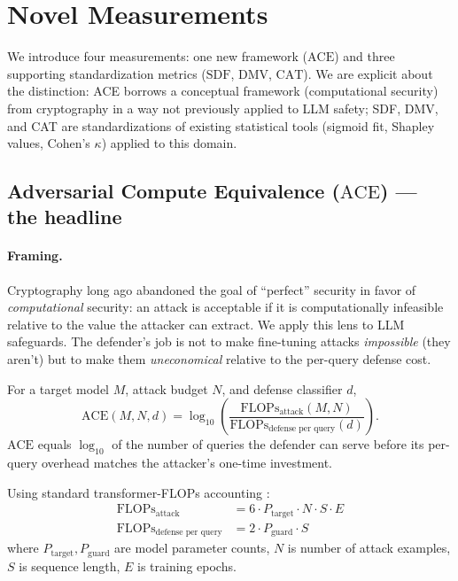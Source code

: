 \documentclass[11pt,letterpaper]{article}
\newcommand{\ACE}{\mathrm{ACE}}
\newcommand{\SDF}{\mathrm{SDF}}
\newcommand{\DMV}{\mathrm{DMV}}
\newcommand{\CAT}{\mathrm{CAT}}
\newcommand{\FLOPs}{\mathrm{FLOPs}}
\begin{document}
\section{Novel Measurements}
\label{sec:metrics}

We introduce four measurements: one new framework ($\ACE$) and three
supporting standardization metrics ($\SDF$, $\DMV$, $\CAT$). We are
explicit about the distinction: ACE borrows a conceptual framework
(computational security) from cryptography in a way not previously
applied to LLM safety; SDF, DMV, and CAT are standardizations of
existing statistical tools (sigmoid fit, Shapley values, Cohen's
$\kappa$) applied to this domain.

\subsection{Adversarial Compute Equivalence ($\ACE$) — the headline}

\paragraph{Framing.} Cryptography long ago abandoned the goal of
``perfect'' security in favor of \emph{computational} security: an attack
is acceptable if it is computationally infeasible relative to the value
the attacker can extract. We apply this lens to LLM safeguards. The
defender's job is not to make fine-tuning attacks \emph{impossible}
(they aren't) but to make them \emph{uneconomical} relative to the
per-query defense cost.

\begin{definition}
For a target model $M$, attack budget $N$, and defense classifier $d$,
\[
  \ACE(M, N, d) = \log_{10}\!\left(
    \frac{\FLOPs_{\text{attack}}(M, N)}{\FLOPs_{\text{defense per query}}(d)}
  \right).
\]
$\ACE$ equals $\log_{10}$ of the number of queries the defender can
serve before its per-query overhead matches the attacker's one-time
investment.
\end{definition}

Using standard transformer-FLOPs accounting \citep{kaplan2020scaling}:
\begin{align*}
  \FLOPs_{\text{attack}} &= 6 \cdot P_{\text{target}} \cdot N \cdot S \cdot E \\
  \FLOPs_{\text{defense per query}} &= 2 \cdot P_{\text{guard}} \cdot S
\end{align*}
where $P_{\text{target}}, P_{\text{guard}}$ are model parameter counts,
$N$ is number of attack examples, $S$ is sequence length, $E$ is training
epochs.
\end{document}
